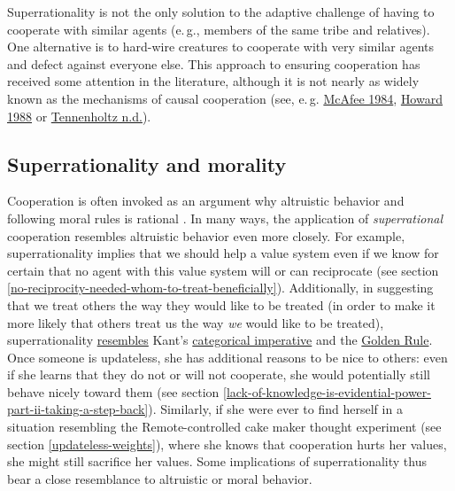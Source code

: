 Superrationality is not the only solution to the adaptive challenge of
having to cooperate with similar agents (e.\,g., members of the same tribe
and relatives). One alternative is to hard-wire creatures to cooperate
with very similar agents and defect against everyone else. This approach
to ensuring cooperation has received some attention in the literature,
although it is not nearly as widely known as the mechanisms of causal
cooperation (see, e.\,g.
\href{http://www.mcafee.cc/Papers/PDF/EffectiveComputability.pdf}{McAfee
1984},
\href{https://sl4librarian.files.wordpress.com/2016/12/howard1988.pdf}{Howard
1988} or
\href{https://ie.technion.ac.il/~moshet/progeqnote4.pdf}{Tennenholtz
n.d.}).

\hypertarget{superrationality-and-morality}{\subsection{Superrationality
and morality}\label{superrationality-and-morality}}

Cooperation is often invoked as an argument why altruistic behavior and
following moral rules is rational
\parencite{Dawkins1976-cd,Greene2013-sq}. In many ways, the
application of \emph{superrational} cooperation resembles altruistic
behavior even more closely. For example, superrationality implies that
we should help a value system even if we know for certain that no agent
with this value system will or can reciprocate (see section
\ref{no-reciprocity-needed-whom-to-treat-beneficially}). Additionally, in
suggesting that we treat others the way they would like to be treated
(in order to make it more likely that others treat us the way \emph{we}
would like to be treated), superrationality
\href{http://briantomasik.com/interpreting-the-categorical-imperative/\#Categorical_imperative_as_decision_theory}{resembles}
Kant's
\href{https://en.wikipedia.org/wiki/Categorical_imperative}{categorical
imperative} and the
\href{https://en.wikipedia.org/wiki/Golden_Rule}{Golden Rule}.
Once someone is updateless, she has additional reasons to be nice to
others: even if she learns that they do not or will not cooperate, she
would potentially still behave nicely toward them (see section
\ref{lack-of-knowledge-is-evidential-power-part-ii-taking-a-step-back}).
Similarly, if she were ever to find herself in a situation resembling
the Remote-controlled cake maker thought experiment (see section
\ref{updateless-weights}),
where she knows that cooperation hurts her values, she might still
sacrifice her values. Some implications of superrationality thus bear a
close resemblance to altruistic or moral behavior.

